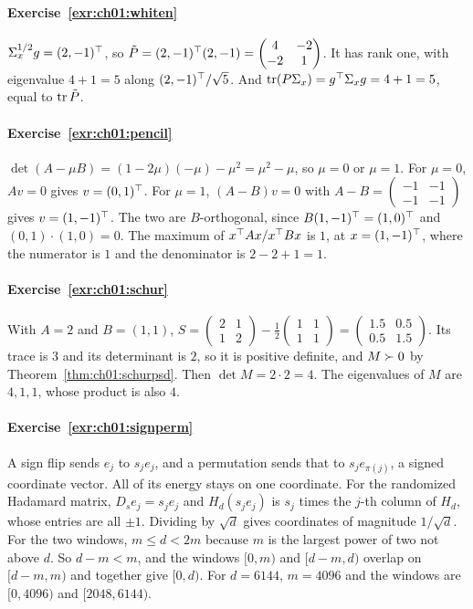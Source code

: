 \paragraph{Exercise~\ref{exr:ch01:whiten}}
$\Sigma_x^{1/2}g=(2,-1)^{\top}$, so $\tilde P=(2,-1)^{\top}(2,-1)=\begin{pmatrix}4&-2\\-2&1\end{pmatrix}$.
It has rank one, with eigenvalue $4+1=5$ along $(2,-1)^{\top}/\sqrt5$. And
$\operatorname{tr}(P\Sigma_x)=g^{\top}\Sigma_xg=4+1=5$, equal to $\operatorname{tr}\tilde P$.

\paragraph{Exercise~\ref{exr:ch01:pencil}}
$\det(A-\mu B)=(1-2\mu)(-\mu)-\mu^2=\mu^2-\mu$, so $\mu=0$ or $\mu=1$. For
$\mu=0$, $Av=0$ gives $v=(0,1)^{\top}$. For $\mu=1$, $(A-B)v=0$ with
$A-B=\begin{pmatrix}-1&-1\\-1&-1\end{pmatrix}$ gives $v=(1,-1)^{\top}$. The two are
$B$-orthogonal, since $B(1,-1)^{\top}=(1,0)^{\top}$ and $(0,1)\cdot(1,0)=0$. The maximum
of $x^{\top} Ax/x^{\top} Bx$ is $1$, at $x=(1,-1)^{\top}$, where the numerator is $1$ and the
denominator is $2-2+1=1$.

\paragraph{Exercise~\ref{exr:ch01:schur}}
With $A=2$ and $B=(1,1)$, $S=\begin{pmatrix}2&1\\1&2\end{pmatrix}-\tfrac12\begin{pmatrix}1&1\\1&1\end{pmatrix}
=\begin{pmatrix}1.5&0.5\\0.5&1.5\end{pmatrix}$. Its trace is $3$ and its
determinant is $2$, so it is positive definite, and $M\succ0$ by
Theorem~\ref{thm:ch01:schurpsd}. Then $\det M=2\cdot2=4$. The eigenvalues of $M$ are
$4,1,1$, whose product is also $4$.

\paragraph{Exercise~\ref{exr:ch01:signperm}}
A sign flip sends $e_j$ to $s_je_j$, and a permutation sends that to $s_je_{\pi(j)}$,
a signed coordinate vector. All of its energy stays on one coordinate. For the
randomized Hadamard matrix, $D_se_j=s_je_j$ and $H_d(s_je_j)$ is $s_j$ times the
$j$-th column of $H_d$, whose entries are all $\pm1$. Dividing by $\sqrt d$ gives
coordinates of magnitude $1/\sqrt d$. For the two windows, $m\le d<2m$ because $m$
is the largest power of two not above $d$. So $d-m<m$, and the windows
$[0,m)$ and $[d-m,d)$ overlap on $[d-m,m)$ and together give $[0,d)$. For
$d=6144$, $m=4096$ and the windows are $[0,4096)$ and $[2048,6144)$.

